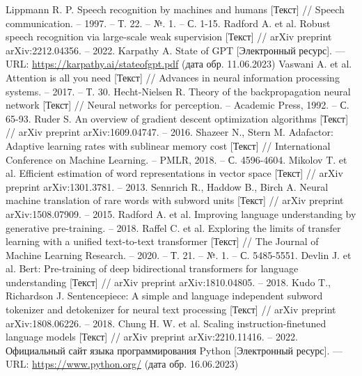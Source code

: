 \begin{thebibliography}{99}
  Lippmann R. P. Speech recognition by machines and humans [Текст] // Speech communication. – 1997. – Т. 22. – №. 1. – С. 1-15.
  Radford A. et al. Robust speech recognition via large-scale weak supervision [Текст] // arXiv preprint arXiv:2212.04356. – 2022.
  Karpathy A. State of GPT [Электронный ресурс]. --- URL: \url{https://karpathy.ai/stateofgpt.pdf} (дата обр. 11.06.2023)
  Vaswani A. et al. Attention is all you need [Текст] // Advances in neural information processing systems. – 2017. – Т. 30.
  Hecht-Nielsen R. Theory of the backpropagation neural network [Текст] // Neural networks for perception. – Academic Press, 1992. – С. 65-93.
  Ruder S. An overview of gradient descent optimization algorithms [Текст] // arXiv preprint arXiv:1609.04747. – 2016.
  Shazeer N., Stern M. Adafactor: Adaptive learning rates with sublinear memory cost [Текст] // International Conference on Machine Learning. – PMLR, 2018. – С. 4596-4604.
  Mikolov T. et al. Efficient estimation of word representations in vector space [Текст] // arXiv preprint arXiv:1301.3781. – 2013.
  Sennrich R., Haddow B., Birch A. Neural machine translation of rare words with subword units [Текст] // arXiv preprint arXiv:1508.07909. – 2015.
  Radford A. et al. Improving language understanding by generative pre-training. – 2018.
  Raffel C. et al. Exploring the limits of transfer learning with a unified text-to-text transformer [Текст] // The Journal of Machine Learning Research. – 2020. – Т. 21. – №. 1. – С. 5485-5551.
  Devlin J. et al. Bert: Pre-training of deep bidirectional transformers for language understanding [Текст] // arXiv preprint arXiv:1810.04805. – 2018.
  Kudo T., Richardson J. Sentencepiece: A simple and language independent subword tokenizer and detokenizer for neural text processing [Текст] // arXiv preprint arXiv:1808.06226. – 2018.
  Chung H. W. et al. Scaling instruction-finetuned language models [Текст] // arXiv preprint arXiv:2210.11416. – 2022.
  Официальный сайт языка программирования Python [Электронный ресурс]. --- URL: \url{https://www.python.org/} (дата обр. 16.06.2023)

\end{thebibliography}
